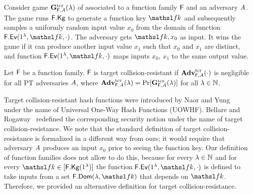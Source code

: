 Consider game $\mathbf{G}^{\rm tcr}_{\mathsf{F},A}(\lambda)$ of  associated to a function family $\mathsf{F}$ and an adversary $A$.
The game runs $\mathsf{F}.\mathsf{Kg}$ to generate a function key $\FKey$ and subsequently samples a uniformly random input value $x_0$ from the domain of function $\Ev{\FF}(\secIn, \FKey, \cdot)$.
The adversary gets $\FKey,x_0$ as input.
It wins the game if it can produce another input value $x_1$ such that $x_0$ and $x_1$ are distinct, and function $\Ev{\FF}(\secIn, \FKey, \cdot)$ maps inputs $x_0$, $x_1$ to the same output value.
\begin{defn}
  Let $\mathsf{F}$ be a function family.
  $\mathsf{F}$ is target collision-resistant if $\mathbf{Adv}^{\rm tcr}_{\mathsf{F},A}(\cdot)$ is negligible for all PT adversaries $A$,
  where $\mathbf{Adv}^{\rm tcr}_{\mathsf{F},A}(\lambda)=\Pr[\mathbf{G}^{\rm tcr}_{\mathsf{F},A}(\lambda)]$ for all $\lambda\in{{\mathbb N}}$.
\end{defn}
Target collision-resistant hash functions were introduced by Naor and Yung~\cite{STOC:NaoYun89} under the name of Universal One-Way Hash Functions (UOWHF).
Bellare and Rogaway~\cite{C:BelRog97} redefined the corresponding security notion under the name of target collision-resistance.
We note that the standard definition of target collision-resistance is formalized in a different way from ours; it would require that adversary $A$ produces an input $x_0$ prior to seeing the function key.
Our definition of function families does not allow to do this, because for every $\lambda\in{{\mathbb N}}$ and for every $\FKey\in[\Kg{\FF}(\secIn)]$ the function $\Ev{\FF}(\secIn,\FKey,\cdot)$ is defined to take inputs from a set $\Dom{\FF}(\secParam,\FKey)$ that depends on $\FKey$.
Therefore, we provided an alternative definition for target collision-resistance.